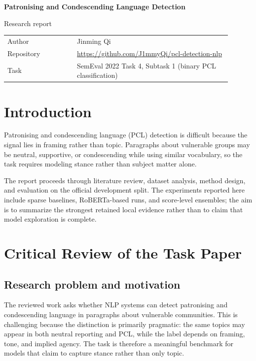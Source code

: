 \documentclass[11pt]{article}
\newcommand{\courseworktitle}{Patronising and Condescending Language Detection}
\newcommand{\repositoryurl}{https://github.com/J1mmyQi/pcl-detection-nlp}
\newcommand{\studentname}{Jinming Qi}
\begin{document}
\begin{titlepage}
    \centering
    {\LARGE \textbf{\courseworktitle} \par}
    \vspace{0.8em}
    {\normalsize Research report \par}
    \vspace{2em}

    \begin{tabular}{>{\raggedright\arraybackslash}p{0.28\linewidth} p{0.62\linewidth}}
        Author & \studentname \\
        Repository & \href{\repositoryurl}{\repositoryurl} \\
        Task & SemEval 2022 Task 4, Subtask 1 (binary PCL classification) \\
    \end{tabular}

\vfill
\end{titlepage}


    \section{Introduction}
    Patronising and condescending language (PCL) detection is difficult because
    the signal lies in framing rather than topic. Paragraphs about vulnerable
    groups may be neutral, supportive, or condescending while using similar
    vocabulary, so the task requires modeling stance rather than subject matter
    alone.

    The report proceeds through literature review, dataset analysis, method
    design, and evaluation on the official development split. The experiments
    reported here include sparse baselines, RoBERTa-based runs, and
    score-level ensembles; the aim is to summarize the strongest retained
    local evidence rather than to claim that model exploration is complete.


    \section{Critical Review of the Task Paper}

    \subsection{Research problem and motivation}
    The reviewed work asks whether NLP systems can detect patronising and
    condescending language in paragraphs about vulnerable communities. This is
    challenging because the distinction is primarily pragmatic: the same topics may
    appear in both neutral reporting and PCL, while the label depends on framing,
    tone, and implied agency. The task is therefore a meaningful benchmark for
    models that claim to capture stance rather than only topic.
\end{document}
